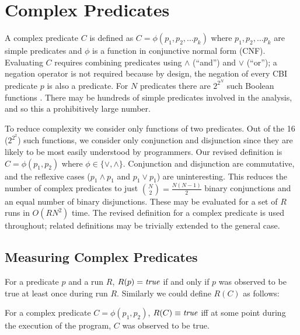 
\section{Complex Predicates}
\label{sec-complex-preds}
A complex predicate $C$ is defined as $C = \phi(p_1, p_2, \ldots p_k)$ where 
$p_1, p_2, \ldots p_k$ are simple predicates and $\phi$ is a function in 
conjunctive normal form (CNF).  Evaluating $C$ requires combining predicates 
using $\wedge$ (``and'') and $\vee$ (``or''); a negation operator is not required 
because by design, the negation of every CBI predicate $p$ is also a predicate.  
For $N$ predicates there are $2^{2^N}$ such Boolean functions 
\cite{MathWorld:BoolFuncs}.  There may be hundreds of simple predicates involved 
in the analysis, and so this a prohibitively large number.

To reduce complexity we consider only functions of two predicates.  Out of the
16 ($2^{2^2}$) such functions, we consider only conjunction and disjunction since
they are likely to be most easily understood by programmers.  Our revised
definition is $C = \phi(p_1, p_2)$ where $\phi \in \{\vee, \wedge\}$.  Conjunction
and disjunction are commutative, and the reflexive cases ($p_1 \wedge p_1$ and 
$p_1 \vee p_1$) are uninteresting.  This reduces the number of complex predicates
to just ${N \choose 2} = \frac{N (N-1)}{2}$ binary conjunctions and an equal number 
of binary disjunctions.  These may be evaluated for a set of $R$ runs in $O(R N^2)$ 
time.  The revised definition for a complex predicate is used throughout; related
definitions may be trivially extended to the general case.

\subsection{Measuring Complex Predicates}
\label{sec-measuring}

For a predicate $p$ and a run $R$, $R(p) = \mathit{true}$ if and only if $p$ was observed to be true at least once during run $R$.  Similarly we could define $R(C)$ as follows:
\begin{defn}
\label{dfn1}
For a complex predicate $C = \phi(p_1, p_2)$, $R(C) \equiv \mathit{true}$ iff at some point during the execution of the program, $C$ was observed to be true.
\end{defn}

